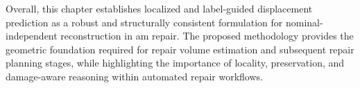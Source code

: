 Overall, this chapter establishes localized and label-guided displacement prediction as a robust and structurally consistent formulation for nominal-independent reconstruction in \ac{am} repair. The proposed methodology provides the geometric foundation required for repair volume estimation and subsequent repair planning stages, while highlighting the importance of locality, preservation, and damage-aware reasoning within automated repair workflows.

\vspace{10mm}  \vspace{2mm}








